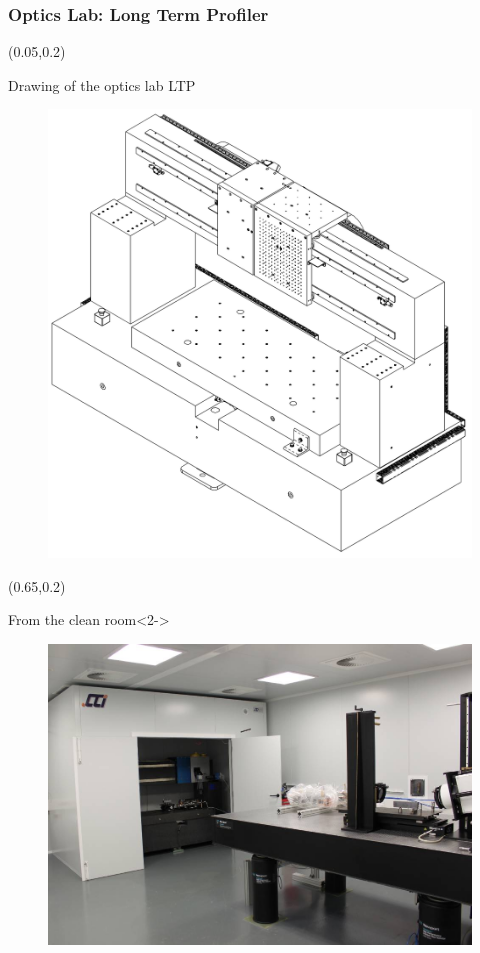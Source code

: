 \documentclass{beamer}
\begin{document}
\begin{frame}
\frametitle{Optics Lab: Long Term Profiler}
    \begin{textblock*}{50mm}(0.05\textwidth,0.2\textheight)
        \begin{block}{Drawing of the optics lab LTP}
            \begin{figure}
                \includegraphics[width=\textwidth]{imgs/laop_ltp_isometric_view.png}
            \end{figure}
        \end{block}
    \end{textblock*}
    \begin{textblock*}{50mm}(0.65\textwidth,0.2\textheight)
        \begin{block}{From the clean room}<2->
            \begin{figure}
                \includegraphics[width=\textwidth]{imgs/alba/laop/01_LTP_a_sala_blanca.jpg}

\end{figure}
\end{block}
\end{textblock*}
\end{frame}
\end{document}
